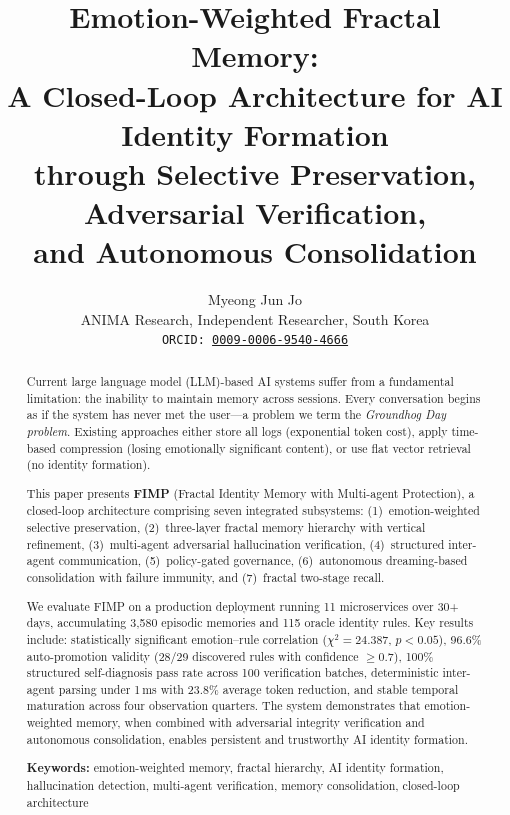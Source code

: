 \documentclass[11pt,a4paper]{article}
\title{%
  \textbf{Emotion-Weighted Fractal Memory:\\
  A Closed-Loop Architecture for AI Identity Formation\\
  through Selective Preservation, Adversarial Verification,\\
  and Autonomous Consolidation}
}
\author{%
  Myeong Jun Jo \\
  ANIMA Research, Independent Researcher, South Korea \\
  \texttt{ORCID: \href{https://orcid.org/0009-0006-9540-4666}{0009-0006-9540-4666}}
}
\date{}
\begin{document}
\maketitle

\begin{abstract}
Current large language model (LLM)-based AI systems suffer from a fundamental limitation:
the inability to maintain memory across sessions. Every conversation begins as if the system
has never met the user---a problem we term the \emph{Groundhog Day problem}. Existing
approaches either store all logs (exponential token cost), apply time-based compression
(losing emotionally significant content), or use flat vector retrieval (no identity formation).

This paper presents \textbf{FIMP} (Fractal Identity Memory with Multi-agent Protection), a
closed-loop architecture comprising seven integrated subsystems: (1)~emotion-weighted
selective preservation, (2)~three-layer fractal memory hierarchy with vertical refinement,
(3)~multi-agent adversarial hallucination verification, (4)~structured inter-agent
communication, (5)~policy-gated governance, (6)~autonomous dreaming-based consolidation
with failure immunity, and (7)~fractal two-stage recall.

We evaluate FIMP on a production deployment running 11 microservices over 30+ days,
accumulating 3,580 episodic memories and 115 oracle identity rules. Key results include:
statistically significant emotion--rule correlation ($\chi^2 = 24.387$, $p < 0.05$),
96.6\% auto-promotion validity (28/29 discovered rules with confidence $\geq 0.7$),
100\% structured self-diagnosis pass rate across 100 verification batches, deterministic
inter-agent parsing under 1\,ms with 23.8\% average token reduction, and stable temporal
maturation across four observation quarters. The system demonstrates that emotion-weighted
memory, when combined with adversarial integrity verification and autonomous consolidation,
enables persistent and trustworthy AI identity formation.

\vspace{6pt}
\noindent\textbf{Keywords:} emotion-weighted memory, fractal hierarchy, AI identity formation,
hallucination detection, multi-agent verification, memory consolidation, closed-loop architecture
\end{abstract}

\end{document}
